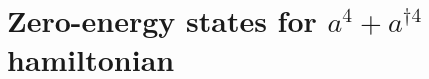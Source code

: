 \documentclass[aps,prb,twocolumn,letterpaper,twoside,nobalancelastpage,groupedaddress,amsmath,amssymb,floatfix,citeautoscript]{revtex4-1}
\begin{document}

\section{Zero-energy states for $a^4 + a^{\dag 4}$ hamiltonian}
\label{zero-enegy-quartic}

\newcommand{\be}{\begin{eqnarray*}}
\newcommand{\ee}{\end{eqnarray*}}
\newcommand{\beq}{\begin{eqnarray}}
\newcommand{\eeq}{\end{eqnarray}}

\newcommand{\h}{\hat{H}}
\newcommand{\hp}{\hat{P}}
\newcommand{\up}{\uparrow}
\newcommand{\down}{\downarrow}
\newcommand{\ph}{{\phantom{\dagger}}}
\newcommand{\hc}{\mathrm{H.c.}}
\newcommand{\an}[1]{\left(a\right^{#1}}
\newcommand{\ad}[1]{\left(a^\dagger\right^{#1}}
\newcommand{\ado}{a^\dagger}
\newcommand{\bdo}{b^\dagger}
\newcommand{\ddp}{\partial}

\newcommand{\kb}[2]{\ket{#1}\!\bra{#2}}
\newcommand{\kbd}[2]{\ket{#2}\!\bra{#1}}

\newcommand{\ketx}[1]{\left|{\frac{\partial^{#1}\tilde{u}_n}{\partial {k_x}^{#1}}}\right\rangle}
\newcommand{\brax}[1]{\left\langle{\frac{\partial^{#1}\tilde{u}_n}{\partial {k_x}^{#1}}}\right|}
\newcommand{\kety}[1]{\left|{\frac{\partial^{#1}\tilde{u}_n}{\partial {k_y}^{#1}}}\right\rangle}
\newcommand{\bray}[1]{\left\langle{\frac{\partial^{#1}\tilde{u}_n}{\partial {k_y}^{#1}}}\right|}

\newcommand{\keto}{\ket{\tilde{u}_n}}
\newcommand{\brao}{\bra{\tilde{u}_n}}

\newcommand{\ketxy}[2]{{\left|\frac{\partial^{#1+#2}\tilde{u}_n}{\partial {k_x}^{#1}\partial {k_y}^{#2}}\right\rangle}}
\newcommand{\braxy}[2]{\left\langle{\frac{\partial^{#1+#2}\tilde{u}_n}{\partial {k_x}^{#1}\partial {k_y}^{#2}}}\right|}

\newcommand{\bbn}{\bra{\tilde{n}}}
\newcommand{\bkn}{\ket{\tilde{n}}}
\newcommand{\bbm}{\bra{\tilde{m}}}
\newcommand{\bkm}{\ket{\tilde{m}}}

\newcommand{\kx}{\hat{k}_x}
\newcommand{\ky}{\hat{k}_y}
\newcommand{\xz}{$(x$-$z$}
\newcommand{\yw}{$(y$-$w$}
\end{document}
